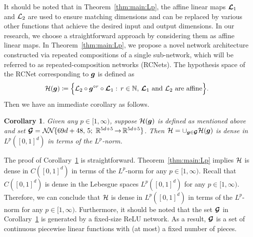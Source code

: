 \documentclass[nohyperref]{article}
\theoremstyle{plain}
\newtheorem{corollary}[theorem]{Corollary}
\theoremstyle{definition}
\theoremstyle{remark}
\begin{document}
It should be noted that in Theorem~\ref{thm:main:Lp}, the affine linear maps ${\bm{\mathcal{L}}}_1$ and ${\mathcal{L}}_2$ are used to ensure matching dimensions and can be replaced by various other functions that achieve the desired input and output dimensions. 
In our research, we choose a straightforward approach by considering them as affine linear maps.
In Theorem~\ref{thm:main:Lp}, we propose a novel network architecture constructed via repeated compositions of a single sub-network, which will be referred to as 
repeated-composition networks (RCNets).
The hypothesis space of the RCNet corresponding to ${\bm{g}}$ is defined as
\begin{equation*}
\begin{split}
         \calH(\bmg)\coloneqq \Big\{\calL_2\circ \bmg^{\circ r}\circ\bmcalL_1:\, r\in \N,\,
         \bmcalL_1 \tn{ and } \calL_2 \tn{ are affine}\Big\}.
\end{split}
\end{equation*}
Then we have an immediate corollary as follows.
\begin{corollary}\label{coro:dense:in:Lp}
    Given any  $p\in [1,\infty)$, suppose ${\mathcal{H}}({\bm{g}})$ is defined as mentioned above and set $\bmcalG=\nn{69d+48}{5}{5d+5}{5d+5}$. Then ${\mathcal{H}}=\cup_{{\bm{g}}\in{\bm{\mathcal{G}}}}{\mathcal{H}}({\bm{g}})$  is dense in $L^p([0,1]^d)$ in terms of the $L^p$-norm.
\end{corollary}

The proof of Corollary~\ref{coro:dense:in:Lp} is straightforward.
Theorem~\ref{thm:main:Lp} implies ${\mathcal{H}}$ is dense in $C([0,1]^d)$ in terms of the $L^p$-norm for any $p\in [1,\infty)$. 
Recall that $C([0,1]^d)$ is  dense in the Lebesgue spaces $L^p([0,1]^d)$ for any $p\in [1,\infty)$. Therefore, we can conclude that ${\mathcal{H}}$ is dense in $L^p([0,1]^d)$ in terms of the $L^p$-norm for any $p\in [1,\infty)$.
Furthermore, it should be noted that the set ${\bm{\mathcal{G}}}$ in Corollary~\ref{coro:dense:in:Lp} is generated by a fixed-size ReLU network. As a result, ${\bm{\mathcal{G}}}$ is a set of continuous piecewise linear functions with (at most) a fixed number of pieces.
\end{document}
